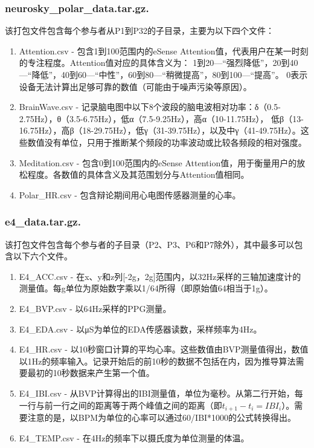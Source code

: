 \subsubsection{neurosky\_polar\_data.tar.gz.}
该打包文件包含每个参与者从P1到P32的子目录，主要为以下四个文件：
\begin{enumerate}
    \item Attention.csv - 包含1到100范围内的eSense Attention值，代表用户在某一时刻的专注程度。Attention值对应的具体含义为：
    1到20—“强烈降低”，20到40—“降低”，40到60—“中性”，60到80—“稍微提高”，80到100—“提高”。
    0表示设备无法计算出足够可靠的数值（可能由于噪声污染等原因）。
    \item BrainWave.csv - 记录脑电图中以下8个波段的脑电波相对功率：δ（0.5-2.75Hz），θ（3.5-6.75Hz），低α（7.5-9.25Hz），高α（10-11.75Hz），
    低β（13-16.75Hz），高β（18-29.75Hz），低γ（31-39.75Hz），以及中γ（41-49.75Hz）。这些数值没有单位，只用于推断某个频段的功率波动或比较各频段的相对强度。
    \item Meditation.csv - 包含0到100范围内的eSense Attention值，用于衡量用户的放松程度。各数值的具体含义及其范围划分与Attention值相同。
    \item Polar\_HR.csv - 包含辩论期间用心电图传感器测量的心率。
\end{enumerate}

\subsubsection{e4\_data.tar.gz.}
该打包文件包含每个参与者的子目录（P2、P3、P6和P7除外），其中最多可以包含以下六个文件。
\begin{enumerate}
    \item E4\_ACC.csv - 在x、y和z列[-2g，2g]范围内，以32Hz采样的三轴加速度计的测量值。每g单位为原始数字乘以1/64所得（即原始值64相当于1g）。
    \item E4\_BVP.csv - 以64Hz采样的PPG测量。
    \item E4\_EDA.csv - 以μS为单位的EDA传感器读数，采样频率为4Hz。
    \item E4\_HR.csv - 以10秒窗口计算的平均心率。这些数值由BVP测量值得出，数值以1Hz的频率输入。记录开始后的前10秒的数据不包括在内，因为推导算法需要最初的10秒数据来产生第一个值。
    \item E4\_IBI.csv - 从BVP计算得出的IBI测量值，单位为毫秒。从第二行开始，每一行与前一行之间的距离等于两个峰值之间的距离（即$t_{i+1} - t_i = IBI_i$）。需要注意的是，以BPM为单位的心率可以通过60/IBI*1000的公式转换得出。
    \item E4\_TEMP.csv - 在4Hz的频率下以摄氏度为单位测量的体温。
\end{enumerate}

